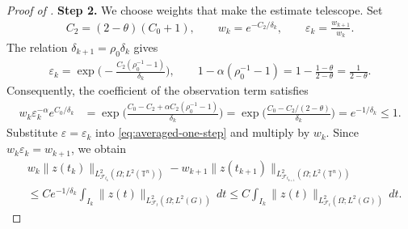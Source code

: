 \documentclass[print,wide]{draft}
\begin{document}
\begin{proof}[Proof of ]
\textbf{Step 2.} We choose weights that make the estimate telescope.
Set
\begin{align*}
C_2=(2-\theta)(C_0+1),\qquad
w_k=e^{-C_2/\delta_k},\qquad \varepsilon_k=\frac{w_{k+1}}{w_k}.
\end{align*}
The relation $\delta_{k+1}=\rho_0\delta_k$ gives
\begin{align*}
\varepsilon_k
=\exp\biggl(-\frac{C_2(\rho_0^{-1}-1)}{\delta_k}\biggr),
\qquad
1-\alpha(\rho_0^{-1}-1)
=1-\frac{1-\theta}{2-\theta}
=\frac1{2-\theta}.
\end{align*}
Consequently, the coefficient of the observation term satisfies
\begin{align*}
w_k\varepsilon_k^{-\alpha}e^{C_0/\delta_k}
&=\exp\biggl(
\frac{C_0-C_2+\alpha C_2(\rho_0^{-1}-1)}{\delta_k}\biggr)
=\exp\biggl(\frac{C_0-C_2/(2-\theta)}{\delta_k}\biggr)
=e^{-1/\delta_k}\leq1.
\end{align*}
Substitute $\varepsilon=\varepsilon_k$ into
\eqref{eq:averaged-one-step} and multiply by $w_k$.
Since $w_k\varepsilon_k=w_{k+1}$, we obtain
\begin{align*}
&w_k\lVert z(t_k)\rVert_{L^2_{\mathcal F_{t_k}}(\Omega;L^2(\mathbb T^n))}
-w_{k+1}\lVert z(t_{k+1})\rVert_{L^2_{\mathcal F_{t_{k+1}}}(\Omega;L^2(\mathbb T^n))} \\
&\leq Ce^{-1/\delta_k}
\int_{I_k}\lVert z(t)\rVert_{L^2_{\mathcal F_t}(\Omega;L^2(G))}\,dt \leq C\int_{I_k}
\lVert z(t)\rVert_{L^2_{\mathcal F_t}(\Omega;L^2(G))}\,dt.
\end{align*}


\end{proof}
\end{document}
